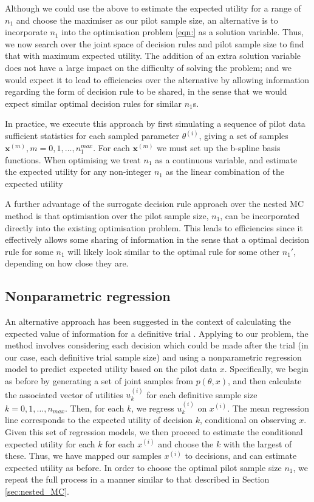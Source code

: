 \documentclass[sagev, Crown]{sagej} %
\begin{document}
Although we could use the above to estimate the expected utility for a range of $n_1$ and choose the maximiser as our pilot sample size, an alternative is to incorporate $n_1$ into the optimisation problem \ref{eqn:} as a solution variable. Thus, we now search over the joint space of decision rules and pilot sample size to find that with maximum expected utility. The addition of an extra solution variable does not have a large impact on the difficulty of solving the problem; and we would expect it to lead to efficiencies over the alternative by allowing information regarding the form of decision rule to be shared, in the sense that we would expect similar optimal decision rules for similar $n_1$s.

In practice, we execute this approach by first simulating a sequence of pilot data sufficient statistics for each sampled parameter $\theta^{(i)}$, giving a set of samples $\mathbf{x}^{(m)}, m = 0, 1, \ldots , n_1^{max}$. For each $\mathbf{x}^{(m)}$ we must set up the b-spline basis functions. When optimising we treat $n_1$ as a continuous variable, and estimate the expected utility for any non-integer $n_1$ as the linear combination of the expected utility 

A further advantage of the surrogate decision rule approach over the nested MC method is that optimisation over the pilot sample size, $n_1$, can be incorporated directly into the existing optimisation problem. This leads to efficiencies since it effectively allows some sharing of information in the sense that a optimal decision rule for some $n_1$ will likely look similar to the optimal rule for some other $n_1'$, depending on how close they are.

\subsection{Nonparametric regression}

An alternative approach has been suggested in the context of calculating the expected value of information for a definitive trial \cite{Strong2015}. Applying to our problem, the method involves considering each decision which could be made after the trial (in our case, each definitive trial sample size) and using a nonparametric regression model to predict expected utility based on the pilot data $x$. Specifically, we begin as before by generating a set of joint samples from $p(\theta, x)$, and then calculate the associated vector of utilities $u^{(i)}_k$ for each definitive sample size $k = 0, 1, \ldots, n_{max}$. Then, for each $k$, we regress $u^{(i)}_k$ on $x^{(i)}$. The mean regression line corresponds to the expected utility of decision $k$, conditional on observing $x$. Given this set of regression models, we then proceed to estimate the conditional expected utility for each $k$ for each $x^{(i)}$ and choose the $k$ with the largest of these. Thus, we have mapped our samples $x^{(i)}$ to decisions, and can estimate expected utility as before. In order to choose the optimal pilot sample size $n_1$, we repeat the full process in a manner similar to that described in Section \ref{sec:nested_MC}.
\end{document}
